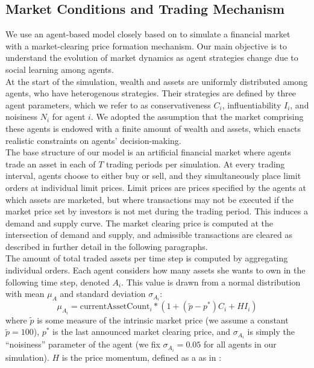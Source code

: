 \documentclass[11pt]{article}
\begin{document}
\subsection{Market Conditions and Trading Mechanism}
We use an agent-based model closely based on \citet{raberto2001agent} to simulate a financial market with a market-clearing price formation mechanism. Our main objective is to understand the evolution of market dynamics as agent strategies change due to social learning among agents. \\
At the start of the simulation, wealth and assets are uniformly distributed among agents, who have heterogenous strategies. Their strategies are defined by three agent parameters, which we refer to as conservativeness $C_i$, influentiability $I_i$, and noisiness $N_i$ for agent $i$. We adopted the assumption that the market comprising these agents is endowed with a finite amount of wealth and assets, which enacts realistic constraints on agents' decision-making. \\
The base structure of our model is an artificial financial market where agents trade an asset in each of $T$ trading periods per simulation. At every trading interval, agents choose to either buy or sell, and they simultaneously place limit orders at individual limit prices. Limit prices are prices specified by the agents at which assets are marketed, but where transactions may not be executed if the market price set by investors is not met during the trading period. This induces a demand and supply curve. The market clearing price is computed at the intersection of demand and supply, and admissible transactions are cleared as described in further detail in the following paragraphs. \\
The amount of total traded assets per time step is computed by aggregating individual orders. Each agent considers how many assets she wants to own in the following time step, denoted $A_i$. This value is drawn from a normal distribution with mean $\mu_A$ and standard deviation $\sigma_{A_i}$:
\begin{equation}
\mu_{A_i} = \text{currentAssetCount}_i * (1 + (\tilde{p} - p^{*}) C_i + H I_i)
\end{equation}
where $\tilde{p}$ is some measure of the intrinsic market price (we assume a constant $\tilde{p}=100$), $p^*$ is the last announced market clearing price, and $\sigma_{A_i}$ is simply the ``noisiness'' parameter of the agent (we fix $\sigma_{A_i} = 0.05$ for all agents in our simulation). $H$ is the price momentum, defined as a as in \citet {kaizoji2015super}:
\end{document}
